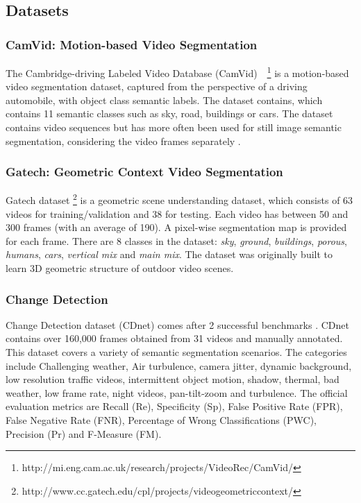 \subsection{Datasets}

\subsubsection{CamVid: Motion-based Video Segmentation}
The Cambridge-driving Labeled Video Database (CamVid)~\cite{
Brostow2010semantic}~\footnote{http://mi.eng.cam.ac.uk/research/projects/VideoRec/CamVid/}
is a motion-based video segmentation dataset, captured
from the perspective of a driving automobile, with object class semantic
labels. The dataset contains, which contains 11 semantic classes such as sky,
road, buildings or cars. The dataset contains video sequences but has more
often been used for still image semantic segmentation, considering the video
frames separately \cite{}.

\subsubsection{Gatech: Geometric Context Video Segmentation}
\label{sssec:gatech}
Gatech dataset
\footnote{http://www.cc.gatech.edu/cpl/projects/videogeometriccontext/}
\cite{VideoGeometricContext2013} is a geometric scene understanding dataset,
which consists of 63 videos for training/validation and 38 for testing. Each
video has between 50 and 300 frames (with an average of 190). A pixel-wise
segmentation map is provided for each frame. There are 8 classes in the
dataset: \textit{sky}, \textit{ground}, \textit{buildings}, \textit{porous},
\textit{humans}, \textit{cars}, \textit{vertical mix} and \textit{main mix}.
The dataset was originally built to learn 3D geometric structure of outdoor
video scenes.


\subsubsection{Change Detection}
\label{sssec:changedet}
Change Detection dataset (CDnet) comes after 2 successful benchmarks
\cite{wang2014cdnet,goyette2012changedetection}. CDnet contains over 160,000
frames obtained from 31 videos and manually annotated. This dataset covers a
variety of semantic segmentation scenarios. The categories include Challenging
weather, Air turbulence, camera jitter, dynamic background, low resolution
traffic videos, intermittent object motion, shadow, thermal, bad weather, low
frame rate, night videos, pan-tilt-zoom and turbulence. The official evaluation
metrics are Recall (Re), Specificity (Sp), False Positive Rate (FPR), False
Negative Rate (FNR), Percentage of Wrong Classifications (PWC), Precision (Pr)
and F-Measure (FM).


